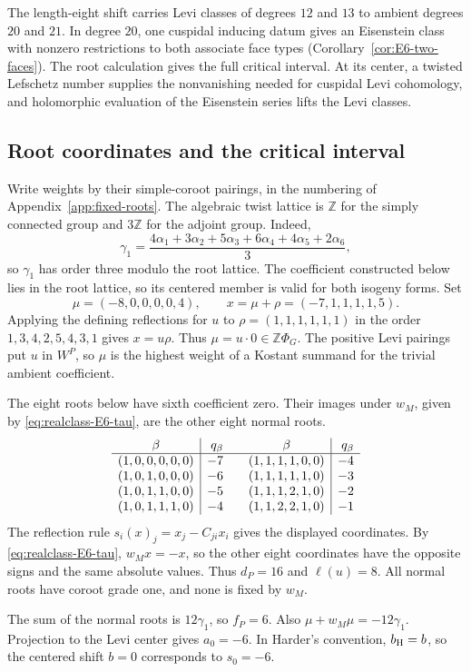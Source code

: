 \documentclass[12pt]{amsart}
\numberwithin{equation}{section}
\theoremstyle{plain}
\theoremstyle{definition}
\theoremstyle{remark}
\newcommand{\Z}{\mathbb{Z}}
\begin{document}
The length-eight shift carries Levi classes of degrees $12$ and $13$ to ambient degrees $20$ and $21$. In degree $20$, one cuspidal inducing datum gives an Eisenstein class with nonzero restrictions to both associate face types (Corollary~\ref{cor:E6-two-faces}). The root calculation gives the full critical interval. At its center, a twisted Lefschetz number supplies the nonvanishing needed for cuspidal Levi cohomology, and holomorphic evaluation of the Eisenstein series lifts the Levi classes.

\subsection{Root coordinates and the critical interval}
Write weights by their simple-coroot pairings, in the numbering of Appendix~\ref{app:fixed-roots}. The algebraic twist lattice is $\Z$ for the simply connected group and $3\Z$ for the adjoint group. Indeed,
\[
 \gamma_1=\frac{4\alpha_1+3\alpha_2+5\alpha_3+6\alpha_4
                    +4\alpha_5+2\alpha_6}{3},
\]
so $\gamma_1$ has order three modulo the root lattice. The coefficient constructed below lies in the root lattice, so its centered member is valid for both isogeny forms. Set
\[
 \mu=(-8,0,0,0,0,4),\qquad
 x=\mu+\rho=(-7,1,1,1,1,5).
\]
Applying the defining reflections for $u$ to $\rho=(1,1,1,1,1,1)$ in the order $1,3,4,2,5,4,3,1$ gives $x=u\rho$. Thus $\mu=u\cdot0\in\Z\Phi_G$. The positive Levi pairings put $u$ in $W^P$, so $\mu$ is the highest weight of a Kostant summand for the trivial ambient coefficient.

The eight roots below have sixth coefficient zero. Their images under $w_M$, given by \eqref{eq:realclass-E6-tau}, are the other eight normal roots.
\[
\begin{array}{c|r@{\qquad}c|r}
 \beta&q_\beta&\beta&q_\beta\\\hline
 (1,0,0,0,0,0)&-7&(1,1,1,1,0,0)&-4\\
 (1,0,1,0,0,0)&-6&(1,1,1,1,1,0)&-3\\
 (1,0,1,1,0,0)&-5&(1,1,1,2,1,0)&-2\\
 (1,0,1,1,1,0)&-4&(1,1,2,2,1,0)&-1
\end{array}
\]
The reflection rule $s_i(x)_j=x_j-C_{ji}x_i$ gives the displayed coordinates. By \eqref{eq:realclass-E6-tau}, $w_M x=-x$, so the other eight coordinates have the opposite signs and the same absolute values. Thus $d_P=16$ and $\ell(u)=8$. All normal roots have coroot grade one, and none is fixed by $w_M$.

The sum of the normal roots is $12\gamma_1$, so $f_P=6$. Also $\mu+w_M\mu=-12\gamma_1$. Projection to the Levi center gives $a_0=-6$. In Harder's convention, $b_{\rm H}=b$, so the centered shift $b=0$ corresponds to $s_0=-6$.
\end{document}

